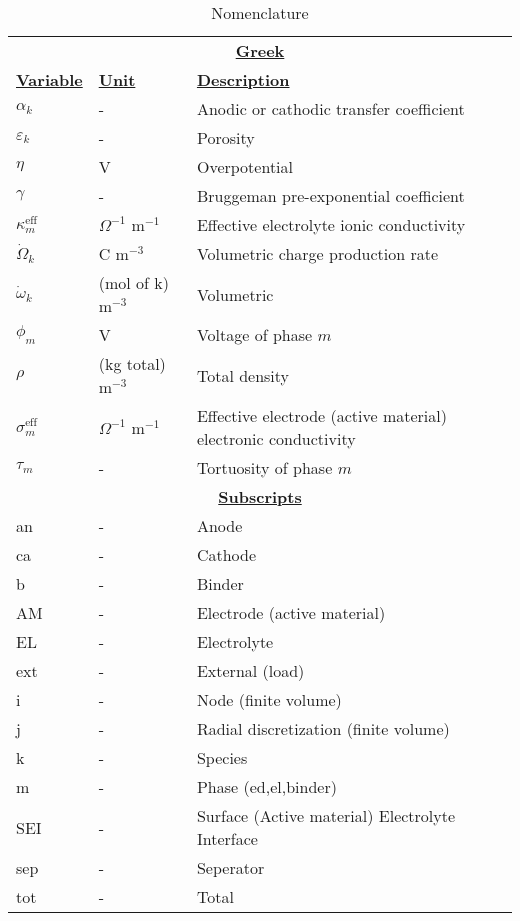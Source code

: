 \documentclass[12pt]{article}
\begin{document}
\begin{table}[]
	\caption{Nomenclature}
	\centering
	\begin{tabular}{lll}
		\multicolumn{3}{c}{\textbf{\underline{Greek}}}      \\
		\textbf{\underline{Variable}}  & \textbf{\underline{Unit}} & \textbf{\underline{Description}} \\
		$\alpha_k$    			& -      					& Anodic or cathodic transfer coefficient            \\
		$\varepsilon_k$ 		& -      					& Porosity            \\
		$\eta$       			& V           				& Overpotential            \\
		$\gamma$       			& -           				& Bruggeman pre-exponential coefficient            \\
		$\kappa_m^{\text{eff}}$	& $\Omega^{-1}$ m$^{-1}$ 	& Effective electrolyte ionic conductivity            \\
		$\dot{\Omega}_k$    	& C m$^{-3}$     			& Volumetric charge production rate            \\
		$\dot{\omega}_k$		& (mol of k) m$^{-3}$		& Volumetric            \\
		$\phi_m$      			& V     					& Voltage of phase $m$            \\
		$\rho$       			& (kg total) m$^{-3}$ 		& Total density            \\
		$\sigma_m^{\text{eff}}$	& $\Omega^{-1}$ m$^{-1}$	& Effective electrode (active material) electronic conductivity   \\
		$\tau_m$       			& -     					& Tortuosity of phase $m$            \\
		\multicolumn{3}{c}{\textbf{\underline{Subscripts}}} \\
		an        & -     & Anode            \\
		ca        & -     & Cathode            \\
		b         & -     & Binder            \\
		AM        & -     & Electrode (active material)           \\
		EL        & -     & Electrolyte            \\
		ext       & -     & External (load)            \\
		i         & -     & Node (finite volume)            \\
		j         & -     & Radial discretization (finite volume)            \\
		k         & -     & Species            \\
		m         & -     & Phase (ed,el,binder)            \\
		SEI       & -     & Surface (Active material) Electrolyte Interface              \\
		sep       & -     & Seperator             \\
		tot       & -     & Total           
	\end{tabular}
\end{table}
\end{document}
